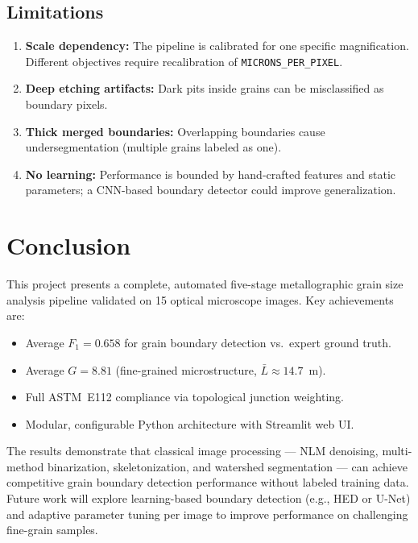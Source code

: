 \documentclass[12pt,a4paper]{article}
\newcommand{\code}[1]{\texttt{#1}}
\begin{document}
\subsection{Limitations}

\begin{enumerate}[leftmargin=*]
    \item \textbf{Scale dependency:} The pipeline is calibrated for one
          specific magnification. Different objectives require recalibration
          of \code{MICRONS\_PER\_PIXEL}.
    \item \textbf{Deep etching artifacts:} Dark pits inside grains can be
          misclassified as boundary pixels.
    \item \textbf{Thick merged boundaries:} Overlapping boundaries cause
          undersegmentation (multiple grains labeled as one).
    \item \textbf{No learning:} Performance is bounded by hand-crafted
          features and static parameters; a CNN-based boundary detector
          could improve generalization.
\end{enumerate}


\section{Conclusion}

This project presents a complete, automated five-stage metallographic grain
size analysis pipeline validated on 15 optical microscope images. Key
achievements are:

\begin{itemize}[leftmargin=*]
    \item Average \textbf{$F_1 = 0.658$} for grain boundary detection vs.\
          expert ground truth.
    \item Average \textbf{$G = 8.81$} (fine-grained microstructure,
          $\bar{L} \approx 14.7$~\textmu m).
    \item Full ASTM~E112 compliance via topological junction weighting.
    \item Modular, configurable Python architecture with Streamlit web UI.
\end{itemize}

The results demonstrate that classical image processing --- NLM denoising,
multi-method binarization, skeletonization, and watershed segmentation ---
can achieve competitive grain boundary detection performance without labeled
training data. Future work will explore learning-based boundary detection
(e.g., HED or U-Net) and adaptive parameter tuning per image to improve
performance on challenging fine-grain samples.
\end{document}
